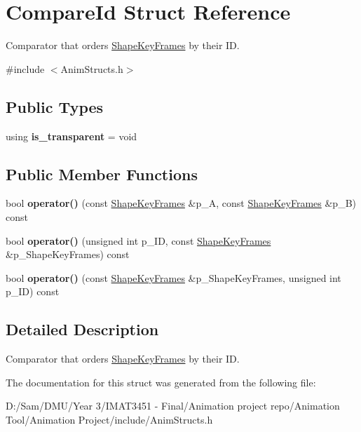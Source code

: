 \hypertarget{struct_compare_id}{}\section{Compare\+Id Struct Reference}
\label{struct_compare_id}


Comparator that orders \hyperlink{struct_shape_key_frames}{Shape\+Key\+Frames} by their ID.  




{\ttfamily \#include $<$Anim\+Structs.\+h$>$}

\subsection*{Public Types}
\begin{DoxyCompactItemize}
\item 
\mbox{\label{struct_compare_id_a7dd0fa1db14a369c56c98ec8339ecf07}} 
using {\bfseries is\+\_\+transparent} = void
\end{DoxyCompactItemize}
\subsection*{Public Member Functions}
\begin{DoxyCompactItemize}
\item 
\mbox{\label{struct_compare_id_a0508f38a87a7e0e225bf9212eba2cd10}} 
bool {\bfseries operator()} (const \hyperlink{struct_shape_key_frames}{Shape\+Key\+Frames} \&p\+\_\+A, const \hyperlink{struct_shape_key_frames}{Shape\+Key\+Frames} \&p\+\_\+B) const
\item 
\mbox{\label{struct_compare_id_aec862adedfa044927c723dc90e9950ef}} 
bool {\bfseries operator()} (unsigned int p\+\_\+\+ID, const \hyperlink{struct_shape_key_frames}{Shape\+Key\+Frames} \&p\+\_\+\+Shape\+Key\+Frames) const
\item 
\mbox{\label{struct_compare_id_a8278695c08e3c32f83db065a124f74ea}} 
bool {\bfseries operator()} (const \hyperlink{struct_shape_key_frames}{Shape\+Key\+Frames} \&p\+\_\+\+Shape\+Key\+Frames, unsigned int p\+\_\+\+ID) const
\end{DoxyCompactItemize}


\subsection{Detailed Description}
Comparator that orders \hyperlink{struct_shape_key_frames}{Shape\+Key\+Frames} by their ID. 

The documentation for this struct was generated from the following file\+:\begin{DoxyCompactItemize}
\item 
D\+:/\+Sam/\+D\+M\+U/\+Year 3/\+I\+M\+A\+T3451 -\/ Final/\+Animation project repo/\+Animation Tool/\+Animation Project/include/Anim\+Structs.\+h\end{DoxyCompactItemize}

